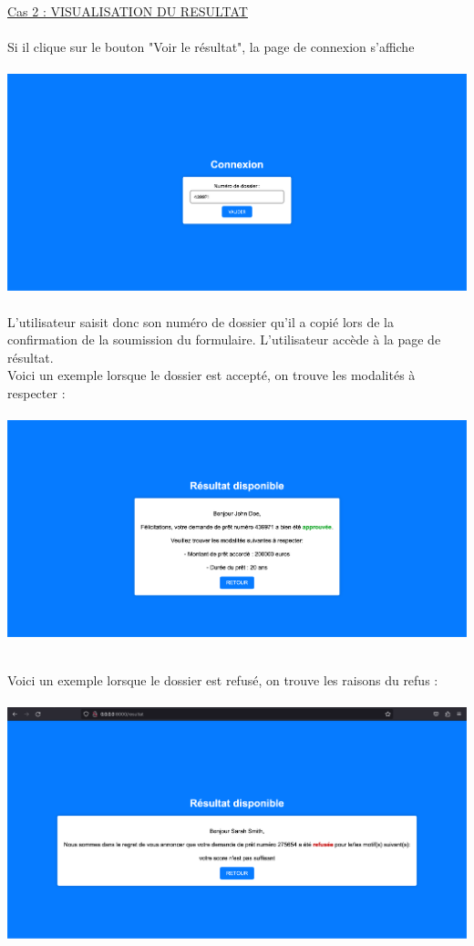 \documentclass{article}
\begin{document}
    \underline{Cas 2 : VISUALISATION DU RESULTAT} \\ \\
	Si il clique sur le bouton "Voir le résultat", la page de connexion s'affiche \\
		\\
	   \includegraphics[width=\textwidth]{Images/8.2/connexiona.png}  \\
	   \\
	L'utilisateur saisit donc son numéro de dossier qu'il a copié lors de la confirmation de la soumission du formulaire.
    L'utilisateur accède à la page de résultat. \\
    
    Voici un exemple lorsque le dossier est accepté, on trouve les modalités à respecter : \\
	   \\
	   \includegraphics[width=\textwidth]{Images/8.2/confirmationa.png} \\
	   \\
	   
	   \newpage
	   
	Voici un exemple lorsque le dossier est refusé, on trouve les raisons du refus : \\
	   \\
    \includegraphics[width=\textwidth]{Images/8.2/confirmationr.png}
     
\end{document}
